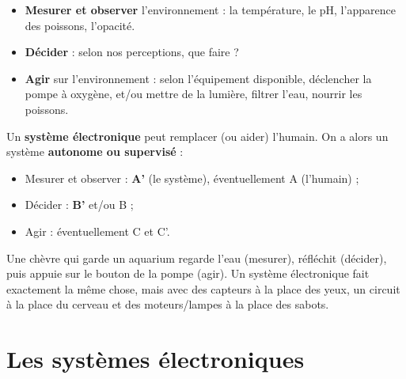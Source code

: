 
\begin{exbox}[title=Régulation d'un aquarium --- à la main]
\begin{itemize}
  \item[\textbf{A.}] \textbf{Mesurer et observer} l'environnement : la température, le pH,
        l'apparence des poissons, l'opacité.
  \item[\textbf{B.}] \textbf{Décider} : selon nos perceptions, que faire ?
  \item[\textbf{C.}] \textbf{Agir} sur l'environnement : selon l'équipement disponible,
        déclencher la pompe à oxygène, et/ou mettre de la lumière, filtrer l'eau, nourrir
        les poissons.
\end{itemize}
\end{exbox}


Un \textbf{système électronique} peut remplacer (ou aider) l'humain. On a alors un système
\textbf{autonome ou supervisé} :
\begin{itemize}
  \item Mesurer et observer : \textbf{A'} (le système), éventuellement A (l'humain) ;
  \item Décider : \textbf{B'} et/ou B ;
  \item Agir : éventuellement C et C'.
\end{itemize}

\begin{goatbox}
Une chèvre qui garde un aquarium regarde l'eau (mesurer), réfléchit (décider), puis appuie
sur le bouton de la pompe (agir). Un système électronique fait exactement la même chose,
mais avec des capteurs à la place des yeux, un circuit à la place du cerveau et des
moteurs/lampes à la place des sabots.
\end{goatbox}

\section{Les systèmes électroniques}


